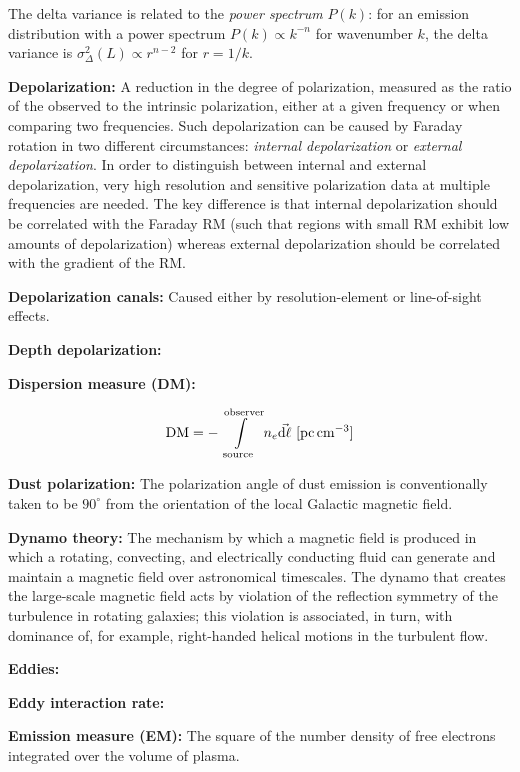 \documentclass[a4paper,10pt]{article}
\begin{document}
{\noindent}The delta variance is related to the \textit{power spectrum} $P(k)$: for an emission distribution with a power spectrum $P(k)\propto k^{-n}$ for wavenumber $k$, the delta variance is $\sigma_\Delta^2(L)\propto r^{n-2}$ for $r=1/k$.

{\noindent}\textbf{Depolarization:} A reduction in the degree of polarization, measured as the ratio of the observed to the intrinsic polarization, either at a given frequency or when comparing two frequencies. Such depolarization can be caused by Faraday rotation in two different circumstances: \textit{internal depolarization} or \textit{external depolarization}. In order to distinguish between internal and external depolarization, very high resolution and sensitive polarization data at multiple frequencies are needed. The key difference is that internal depolarization should be correlated with the Faraday RM (such that regions with small RM exhibit low amounts of depolarization) whereas external depolarization should be correlated with the gradient of the RM.

{\noindent}\textbf{Depolarization canals:} Caused either by resolution-element or line-of-sight effects.

{\noindent}\textbf{Depth depolarization:}

{\noindent}\textbf{Dispersion measure (DM):}

\begin{align*}
    {\rm DM} = -\int\limits_\mathrm{source}^\mathrm{observer} n_e\vec{{\rm d}\ell} ~ [{\rm pc\,cm^{-3}}]
\end{align*}

{\noindent}\textbf{Dust polarization:} The polarization angle of dust emission is conventionally taken to be $90^\circ$ from the orientation of the local Galactic magnetic field.

{\noindent}\textbf{Dynamo theory:} The mechanism by which a magnetic field is produced in which a rotating, convecting, and electrically conducting fluid can generate and maintain a magnetic field over astronomical timescales. The dynamo that creates the large-scale magnetic field acts by violation of the reflection symmetry of the turbulence in rotating galaxies; this violation is associated, in turn, with dominance of, for example, right-handed helical motions in the turbulent flow.

{\noindent}\textbf{Eddies:}

{\noindent}\textbf{Eddy interaction rate:}

{\noindent}\textbf{Emission measure (EM):} The square of the number density of free electrons integrated over the volume of plasma.
\end{document}
